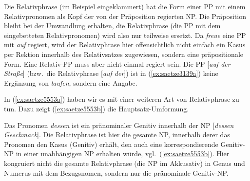 \begin{exe}
  \ex\label{ex:saetze5552} 
    \begin{xlist}
    \end{xlist} 
\end{exe}

Die Relativphrase (im Beispiel eingeklammert) hat die Form einer PP mit einem Relativpronomen als Kopf der von der Präposition regierten NP.
Die Präposition bleibt bei der Umwandlung erhalten, die Relativphrase (die PP mit dem eingebetteten Relativpronomen) wird also nur teilweise ersetzt.
Da \textit{freue} eine PP mit \textit{auf} regiert, wird der Relativphrase hier offensichtlich nicht einfach ein Kasus per Rektion innerhalb des Relativsatzes zugewiesen, sondern eine präpositionale Form.
Eine Relativ-PP muss aber nicht einmal regiert sein.
Die PP [\textit{auf der Straße}] (bzw.\ die Relativphrase [\textit{auf der}]) ist  in (\ref{ex:saetze3139a}) keine Ergänzung von \textit{laufen}, sondern eine Angabe.

\begin{exe}
  \ex\label{ex:saetze3139}
  \begin{xlist}
  \end{xlist}
\end{exe}

In (\ref{ex:saetze5553a}) haben wir es mit einer weiteren Art von Relativphrase zu tun.
Dazu zeigt (\ref{ex:saetze5553b}) die Hauptsatz-Umformung.

\begin{exe}
  \ex\label{ex:saetze5553} 
    \begin{xlist}
    \end{xlist}
\end{exe}

Das Pronomen \textit{dessen} ist ein pränominaler Genitiv innerhalb der NP [\textit{dessen Geschmack}].
Die Relativphrase ist hier die gesamte NP, innerhalb derer das Pronomen den Kasus (Genitiv) erhält, den auch eine korrespondierende Genitiv-NP in einer unabhängigen NP erhalten würde, vgl.\ (\ref{ex:saetze5553b}).
Hier kongruiert nicht die gesamte Relativphrase (die NP im Akkusativ) in Genus und Numerus mit dem Bezugsnomen, sondern nur die pränominale Genitiv-NP.

